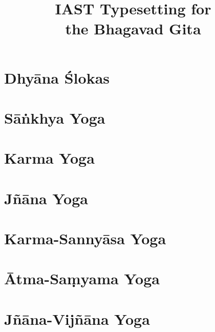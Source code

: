 \documentclass{scrbook}
\title{IAST Typesetting for \\ the Bhagavad Gita}
\author{}
\begin{document}
\maketitle
\frontmatter

\tableofcontents
\newpage

\chapter{Dhyāna Ślokas}


\mainmatter
\setcounter{chapter}{1}

\chapter{Sāṅkhya Yoga}
\begin{multicols}{2}
    
\end{multicols}

\chapter{Karma Yoga}
\begin{multicols}{2}
    
\end{multicols}

\chapter{Jñāna Yoga}
\begin{multicols}{2}
    
\end{multicols}

\chapter{Karma-Sannyāsa Yoga}
\begin{multicols}{2}
    
\end{multicols}

\chapter{Ātma-Saṃyama Yoga}
\begin{multicols}{2}
    
\end{multicols}

\chapter{Jñāna-Vijñāna Yoga}
\begin{multicols}{2}
    
\end{multicols}
\end{document}
